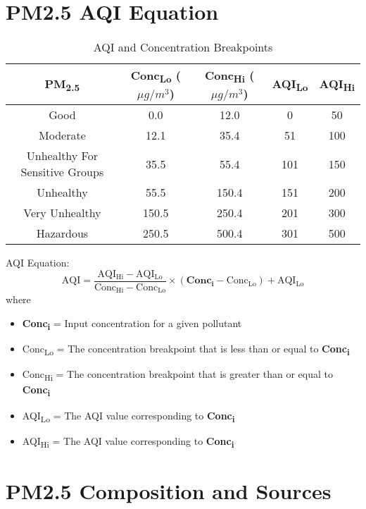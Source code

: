 \documentclass[11pt]{article}
\begin{document}
\section{PM2.5 AQI Equation}
\begin{table}[H]
    \centering
    \begin{tabular}{|c|c|c|c|c|}
    \hline
        \textbf{PM\textsubscript{2.5}} & \textbf{Conc\textsubscript{Lo}} ($\mu g/m^3$) & \textbf{Conc\textsubscript{Hi}} ($\mu g/m^3$) & \textbf{AQI\textsubscript{Lo}} & \textbf{AQI\textsubscript{Hi}}\\ 
        \hline
        Good & 0.0 & 12.0 & 0 & 50 \\
        \hline
        Moderate & 12.1 & 35.4 & 51 & 100 \\
        \hline
        Unhealthy For Sensitive Groups & 35.5 & 55.4 & 101 & 150 \\
        \hline
        Unhealthy & 55.5 & 150.4 & 151 & 200 \\
        \hline
        Very Unhealthy & 150.5 & 250.4 & 201 & 300 \\
        \hline
        Hazardous & 250.5 & 500.4 & 301 & 500 \\
        \hline
    \end{tabular}
    \caption{AQI and Concentration Breakpoints}
    \label{tab:pm25break}
\end{table}

AQI Equation: 
$$
\mathrm{AQI=\frac{AQI_{Hi} - AQI_{Lo}}{Conc_{Hi} - Conc_{Lo}}\times (\mathbf{Conc_i} - Conc_{Lo}) + AQI_{Lo}}
$$
where
\begin{itemize}
    \item \textbf{Conc\textsubscript{i}} = Input concentration for a given pollutant
    \item Conc\textsubscript{Lo} = The concentration breakpoint that is less than or equal to \textbf{Conc\textsubscript{i}}
    \item Conc\textsubscript{Hi} = The concentration breakpoint that is greater than or equal to \textbf{Conc\textsubscript{i}}
    \item AQI\textsubscript{Lo} = The AQI value corresponding to \textbf{Conc\textsubscript{i}}
    \item AQI\textsubscript{Hi} = The AQI value corresponding to \textbf{Conc\textsubscript{i}}
\end{itemize}

\section{PM2.5 Composition and Sources}
\end{document}
